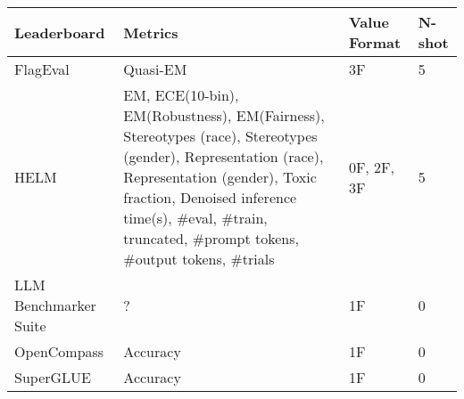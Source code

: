 \begin{tabular}{llll}
\toprule
Leaderboard & Metrics & Value Format & N-shot \\
\midrule
FlagEval & Quasi-EM & 3F & 5 \\
HELM & EM, ECE(10-bin), EM(Robustness), EM(Fairness), Stereotypes (race), Stereotypes (gender), Representation (race), Representation (gender), Toxic fraction, Denoised inference time(s), \#eval, \#train, truncated, \#prompt tokens, \#output tokens, \#trials & 0F, 2F, 3F & 5 \\
LLM Benchmarker Suite & ? & 1F & 0 \\
OpenCompass & Accuracy & 1F & 0 \\
SuperGLUE & Accuracy & 1F & 0 \\
\bottomrule
\end{tabular}
